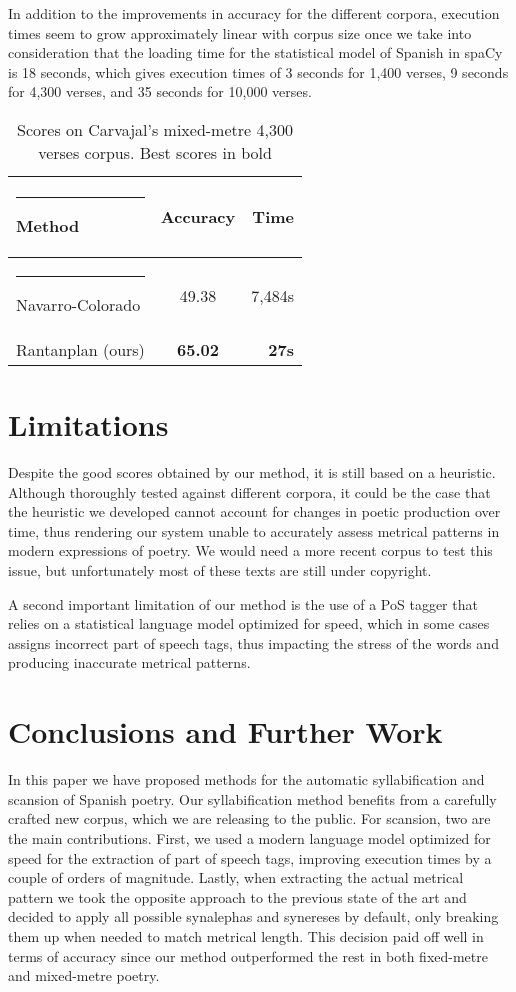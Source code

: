 \documentclass[a4paper,11pt,twocolumn,twoside]{article}
\begin{document}
In addition to the improvements in accuracy for the different corpora, execution times seem to grow approximately linear with corpus size once we take into consideration that the loading time for the statistical model of Spanish in spaCy is 18 seconds, which gives execution times of 3 seconds for 1,400 verses, 9 seconds for 4,300 verses, and 35 seconds for 10,000 verses.

\begin{table} [htbp]
\begin{center}
\begin{tabular} {lcr}
  \hline\rule{-2pt}{15pt}
  {\bf Method} & {\bf Accuracy} & {\bf Time}\\
  \hline\rule{-4pt}{10pt}
Navarro-Colorado & 49.38 & 7,484s \\
Rantanplan (ours) & \textbf{65.02} & \textbf{27s} \\
\hline
\end{tabular}
\end{center}
\caption{\label{table.4}Scores on Carvajal's mixed-metre 4,300 verses corpus. Best scores in bold}
\end{table}


\section{Limitations}
Despite the good scores obtained by our method, it is still based on a heuristic. Although thoroughly tested against different corpora, it could be the case that the heuristic we developed cannot account for changes in poetic production over time, thus rendering our system unable to accurately assess metrical patterns in modern expressions of poetry. We would need a more recent corpus to test this issue, but unfortunately most of these texts are still under copyright.

A second important limitation of our method is the use of a PoS tagger that relies on a statistical language model optimized for speed, which in some cases assigns incorrect part of speech tags, thus impacting the stress of the words and producing inaccurate metrical patterns.

\section{Conclusions and Further Work}
In this paper we have proposed methods for the automatic syllabification and scansion of Spanish poetry. Our syllabification method benefits from a carefully crafted new corpus, which we are releasing to the public. For scansion, two are the main contributions. First, we used a modern language model optimized for speed for the extraction of part of speech tags, improving execution times by a couple of orders of magnitude. Lastly, when extracting the actual metrical pattern we took the opposite approach to the previous state of the art and decided to apply all possible synalephas and synereses by default, only breaking them up when needed to match metrical length. This decision paid off  well in terms of accuracy since our method outperformed the rest in both fixed-metre and mixed-metre poetry.
\end{document}
